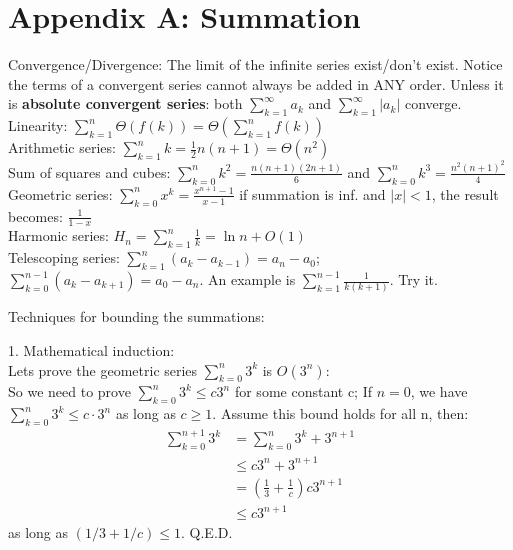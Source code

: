 \documentclass{article}
\begin{document}
\section*{Appendix A: Summation}
Convergence/Divergence: The limit of the infinite series exist/don't exist. Notice the terms of a convergent series cannot always be added in ANY order. 
Unless it is \textbf{absolute convergent series}: both $\sum_{k=1}^{\infty}a_k$ and $\sum_{k=1}^{\infty}|a_k|$ converge.\\

Linearity:  $\sum_{k=1}^{n}\Theta(f(k)) = \Theta(\sum_{k=1}^{n}f(k))$\\

Arithmetic series: $\sum_{k=1}^{n}k = \frac{1}{2} n(n+1) = \Theta(n^2)$\\

Sum of squares and cubes: $\sum_{k=0}^{n}k^2 = \frac{n(n+1)(2n+1)}{6}$ and $\sum_{k=0}^{n}k^3 = \frac{n^2(n+1)^2}{4}$\\

Geometric series: $\sum_{k=0}^{n}x^k = \frac{x^{n+1} -1}{x-1}$ if summation is inf. and $|x| < 1$, the result becomes: $\frac{1}{1-x}$\\

Harmonic series: $H_n = \sum_{k=1}^{n}\frac{1}{k} = \ln n + O(1)$\\

Telescoping series: $\sum_{k=1}^{n}(a_k -a_{k-1}) = a_n - a_0$; $\sum_{k=0}^{n-1}(a_k - a_{k+1}) = a_0 - a_n$. An example is $\sum_{k=1}^{n-1}\frac{1}{k(k+1)}$. Try it.

Techniques for bounding the summations:

1. Mathematical induction:\\
Lets prove the geometric series {\color{blue}$\sum_{k=0}^n 3^k$ is $O(3^n)$}:\\
So we need to prove {\color{blue}$\sum_{k=0}^n 3^k \leq c3^n$} for some constant c; If $n=0$, we have {\color{darkgreen}$\sum_{k=0}^n 3^k \leq c \cdot 3^n$} as long as $c\geq 1$. {\color{darkgreen} Assume this bound holds for all n}, then:
\begin{align*}
    \sum_{k=0}^{n+1} 3^{k} &=\sum_{k=0}^{n} 3^{k}+3^{n+1} \\
    & \leq c 3^{n}+3^{n+1} \\
    &=\left(\frac{1}{3}+\frac{1}{c}\right) c 3^{n+1} \\
    & \leq c 3^{n+1}
\end{align*}
as long as $(1/3 +1/c) \leq 1$. Q.E.D.\\
\end{document}
